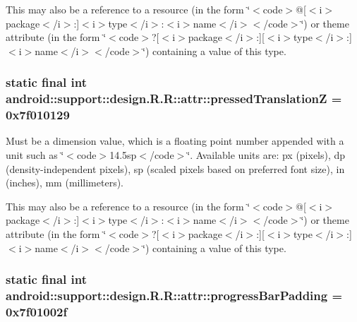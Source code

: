 This may also be a reference to a resource (in the form \char`\"{}$<$code$>$@\mbox{[}$<$i$>$package$<$/i$>$:\mbox{]}$<$i$>$type$<$/i$>$:$<$i$>$name$<$/i$>$$<$/code$>$\char`\"{}) or theme attribute (in the form \char`\"{}$<$code$>$?\mbox{[}$<$i$>$package$<$/i$>$:\mbox{]}\mbox{[}$<$i$>$type$<$/i$>$:\mbox{]}$<$i$>$name$<$/i$>$$<$/code$>$\char`\"{}) containing a value of this type. \hypertarget{classandroid_1_1support_1_1design_1_1_r_1_1attr_f6e2dc818b188e8e3b0275a38e8fa84c}{
\subsubsection[{pressedTranslationZ}]{\setlength{\rightskip}{0pt plus 5cm}static final int android::support::design.R.R::attr::pressedTranslationZ = 0x7f010129}}
\label{classandroid_1_1support_1_1design_1_1_r_1_1attr_f6e2dc818b188e8e3b0275a38e8fa84c}


Must be a dimension value, which is a floating point number appended with a unit such as \char`\"{}$<$code$>$14.5sp$<$/code$>$\char`\"{}. Available units are: px (pixels), dp (density-independent pixels), sp (scaled pixels based on preferred font size), in (inches), mm (millimeters). 

This may also be a reference to a resource (in the form \char`\"{}$<$code$>$@\mbox{[}$<$i$>$package$<$/i$>$:\mbox{]}$<$i$>$type$<$/i$>$:$<$i$>$name$<$/i$>$$<$/code$>$\char`\"{}) or theme attribute (in the form \char`\"{}$<$code$>$?\mbox{[}$<$i$>$package$<$/i$>$:\mbox{]}\mbox{[}$<$i$>$type$<$/i$>$:\mbox{]}$<$i$>$name$<$/i$>$$<$/code$>$\char`\"{}) containing a value of this type. \hypertarget{classandroid_1_1support_1_1design_1_1_r_1_1attr_04403330490b67cd2e575449f91dc427}{
\subsubsection[{progressBarPadding}]{\setlength{\rightskip}{0pt plus 5cm}static final int android::support::design.R.R::attr::progressBarPadding = 0x7f01002f}}
\label{classandroid_1_1support_1_1design_1_1_r_1_1attr_04403330490b67cd2e575449f91dc427}


